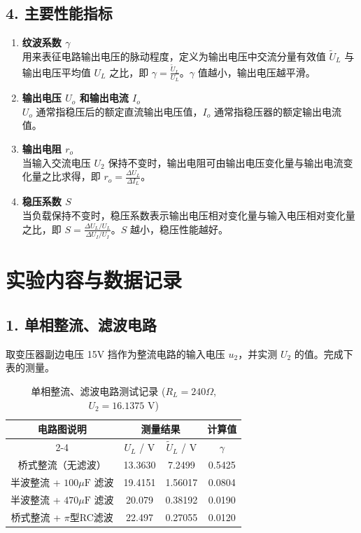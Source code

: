 ﻿\documentclass[10.5pt]{config}
\begin{document}
\subsection*{4. 主要性能指标}
\begin{enumerate}[label=(\arabic*), leftmargin=2em]
    \item \textbf{纹波系数 $\gamma$} \\
    用来表征电路输出电压的脉动程度，定义为输出电压中交流分量有效值 $\tilde{U}_L$ 与输出电压平均值 $U_L$ 之比，即 $\gamma = \frac{\tilde{U}_L}{U_L}$。$\gamma$ 值越小，输出电压越平滑。
    \item \textbf{输出电压 $U_o$ 和输出电流 $I_o$} \\
    $U_o$ 通常指稳压后的额定直流输出电压值，$I_o$ 通常指稳压器的额定输出电流值。
    \item \textbf{输出电阻 $r_o$} \\
    当输入交流电压 $U_2$ 保持不变时，输出电阻可由输出电压变化量与输出电流变化量之比求得，即 $r_o = \frac{\Delta U_L}{\Delta I_L}$。
    \item \textbf{稳压系数 $S$} \\
    当负载保持不变时，稳压系数表示输出电压相对变化量与输入电压相对变化量之比，即 $S = \frac{\Delta U_L / U_L}{\Delta U_I / U_I}$。$S$ 越小，稳压性能越好。
\end{enumerate}

\section{实验内容与数据记录}

\subsection*{1. 单相整流、滤波电路}
取变压器副边电压 15V 挡作为整流电路的输入电压 $u_2$，并实测 $U_2$ 的值。完成下表的测量。

\begin{table}[H]
    \centering
    \caption{单相整流、滤波电路测试记录 ($R_L = 240\Omega$, $U_2 = 16.1375$ V)}
    \begin{tabular}{|c|c|c|c|}
        \hline
        \multirow{2}{*}{电路图说明} & \multicolumn{2}{c|}{测量结果} & 计算值 \\ \cline{2-4}
        & $U_L$ / V & $\tilde{U}_L$ / V & $\gamma$ \\ \hline
        桥式整流（无滤波） & 13.3630 & 7.2499 & 0.5425 \\ \hline
        半波整流 + $100\mu\text{F}$ 滤波 & 19.4151 & 1.56017 & 0.0804 \\ \hline
        半波整流 + $470\mu\text{F}$ 滤波 & 20.079 & 0.38192 & 0.0190 \\ \hline
        桥式整流 + $\pi$型RC滤波 & 22.497 & 0.27055 & 0.0120 \\ \hline
    \end{tabular}
\end{table}
\end{document}
